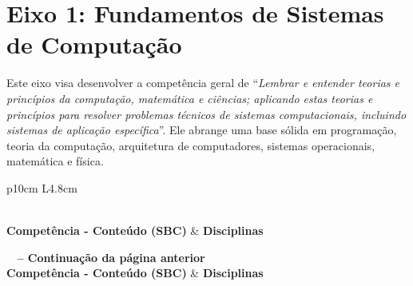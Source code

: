 \section{Eixo 1: Fundamentos de Sistemas de Computação}
Este eixo visa desenvolver a competência geral de ``\textit{Lembrar e entender teorias e princípios da computação, matemática e ciências; aplicando estas teorias e princípios para resolver problemas técnicos de sistemas computacionais, incluindo sistemas de aplicação específica}''. Ele abrange uma base sólida em programação, teoria da computação, arquitetura de computadores, sistemas operacionais, matemática e física.

\begin{small}
    \begin{longtable}{p{10cm} L{4.8cm}}
        \caption{Relação entre as competências do Eixo 1 da SBC e as disciplinas do curso} \label{eixo1}                                                                                                                                                                                                                                                            \\
        \toprule
        \textbf{Competência - Conteúdo (SBC)}                                                                                                                                                                                                                                                    & \textbf{Disciplinas}                                             \\
        \midrule
        \endfirsthead

        {{\bfseries \tablename\ \thetable{} -- Continuação da página anterior}}                                                                                                                                                                                                                                                                                     \\
        \toprule
        \textbf{Competência - Conteúdo (SBC)}                                                                                                                                                                                                                                                    & \textbf{Disciplinas}                                             \\
        \midrule
        \endhead


\end{longtable}
\end{small}
